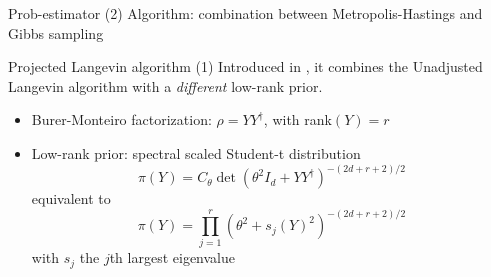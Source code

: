 \documentclass{beamer}
\begin{document}
\begin{frame}{Prob-estimator (2)}
    Algorithm: combination between Metropolis-Hastings and Gibbs sampling\medbreak
    
\begin{algorithm}[H]

    \DontPrintSemicolon


    \caption{Prob-estimator algorithm}

\end{algorithm}\medbreak

\end{frame}
\begin{frame}{Projected Langevin algorithm (1)}
    Introduced in \cite{ACMT2024}, it combines the Unadjusted Langevin algorithm with a \textit{different} low-rank prior.
    \begin{itemize}
        \item Burer-Monteiro factorization: $\rho = YY^\dagger$, with rank$(Y)=r$ 
        \item Low-rank prior: spectral scaled Student-t distribution
        \begin{equation}
            \pi(Y) = C_\theta \det(\theta^2I_d + YY^\dagger)^{-(2d+r+2)/2}
        \end{equation}
        equivalent to 
        \begin{equation}
            \pi(Y) = \prod_{j=1}^r (\theta^2 + s_j(Y)^2)^{-(2d+r+2)/2}
        \end{equation}
        with $s_j$ the $j$th largest eigenvalue
    \end{itemize} 
\end{frame}
\end{document}

